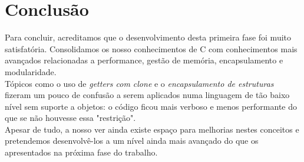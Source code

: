 \documentclass{article}
\begin{document}
    \section{Conclusão}
        Para concluir, acreditamos que o desenvolvimento desta primeira fase foi
        muito satisfatória. Consolidamos os nosso conhecimentos de C com 
        conhecimentos mais avançados relacionadas a performance, gestão de memória, 
        encapsulamento e modularidade. 
        \\Tópicos como o uso de \emph{getters com clone}
        e o \emph{encapsulamento de estruturas} fizeram um pouco de confusão a 
        serem aplicados numa linguagem de tão baixo nível sem suporte a objetos:
        o código ficou  mais verboso e menos performante do que se não houvesse
        essa "restrição".
        \\Apesar de tudo, a nosso ver ainda existe 
        espaço para melhorias nestes conceitos e pretendemos 
        desenvolvê-los a um nível ainda mais avançado do que
        os apresentados na próxima fase do trabalho.
\end{document}
